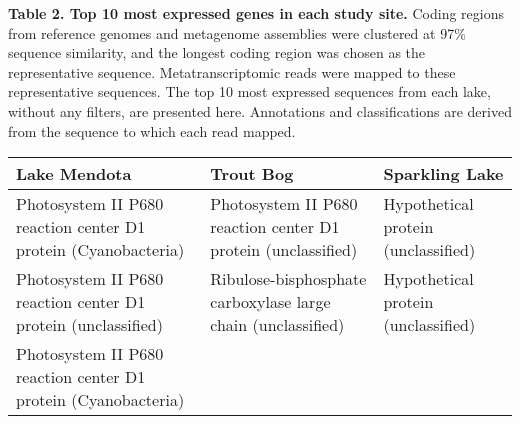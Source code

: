 \documentclass[]{article}
\begin{document}
\textbf{Table 2. Top 10 most expressed genes in each study site.} Coding
regions from reference genomes and metagenome assemblies were clustered
at 97\% sequence similarity, and the longest coding region was chosen as
the representative sequence. Metatranscriptomic reads were mapped to
these representative sequences. The top 10 most expressed sequences from
each lake, without any filters, are presented here. Annotations and
classifications are derived from the sequence to which each read mapped.

\begin{longtable}[]{@{}lll@{}}
\toprule
\begin{minipage}[b]{0.24\columnwidth}\raggedright\strut
Lake Mendota\strut
\end{minipage} & \begin{minipage}[b]{0.33\columnwidth}\raggedright\strut
Trout Bog\strut
\end{minipage} & \begin{minipage}[b]{0.33\columnwidth}\raggedright\strut
Sparkling Lake\strut
\end{minipage}\tabularnewline
\midrule
\endhead
\begin{minipage}[t]{0.24\columnwidth}\raggedright\strut
Photosystem II P680 reaction center D1 protein (Cyanobacteria)\strut
\end{minipage} & \begin{minipage}[t]{0.33\columnwidth}\raggedright\strut
Photosystem II P680 reaction center D1 protein (unclassified)\strut
\end{minipage} & \begin{minipage}[t]{0.33\columnwidth}\raggedright\strut
Hypothetical protein (unclassified)\strut
\end{minipage}\tabularnewline
\begin{minipage}[t]{0.24\columnwidth}\raggedright\strut
Photosystem II P680 reaction center D1 protein (unclassified)\strut
\end{minipage} & \begin{minipage}[t]{0.33\columnwidth}\raggedright\strut
Ribulose-bisphosphate carboxylase large chain (unclassified)\strut
\end{minipage} & \begin{minipage}[t]{0.33\columnwidth}\raggedright\strut
Hypothetical protein (unclassified)\strut
\end{minipage}\tabularnewline
\begin{minipage}[t]{0.24\columnwidth}\raggedright\strut
Photosystem II P680 reaction center D1 protein (Cyanobacteria)\strut

\end{minipage}
\end{longtable}
\end{document}
